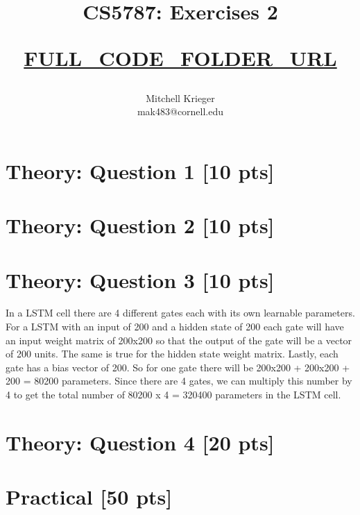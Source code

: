 \documentclass{article}
\title{CS5787: Exercises 2 \\ \begin{small}\url{FULL_CODE_FOLDER_URL}\end{small}}
\author{Mitchell Krieger \\ mak483@cornell.edu}
\date{}
\begin{document}
\maketitle

\section{Theory: Question 1 [10 pts]}


\section{Theory: Question 2 [10 pts]}

\section{Theory: Question 3 [10 pts]}

In a LSTM cell there are 4 different gates each with its own learnable parameters. For a LSTM with an input of 200 and a hidden state of 200 each gate will have an input weight matrix of 200x200 so that the output of the gate will be a vector of 200 units. The same is true for the hidden state weight matrix. Lastly, each gate has a bias vector of 200. So for one gate there will be 200x200 + 200x200 + 200 = 80200 parameters. Since there are 4 gates, we can multiply this number by 4 to get the total number of 80200 x 4 = 320400 parameters in the LSTM cell.

\section{Theory: Question 4 [20 pts]}

\section{Practical [50 pts]}
\end{document}
